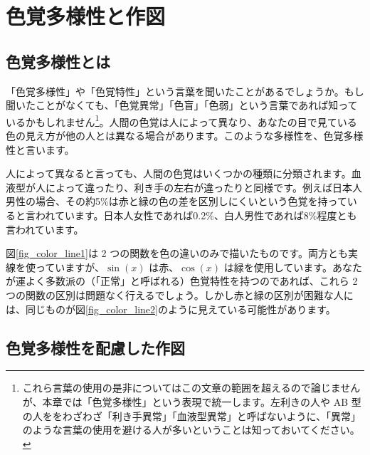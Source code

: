 \chapter{色覚多様性と作図}
\label{chap:color}

\section{色覚多様性とは}

「色覚多様性」や「色覚特性」という言葉を聞いたことがあるでしょうか。もし聞いたことがなくても、「色覚異常」「色盲」「色弱」という言葉であれば知っているかもしれません\footnote{これら言葉の使用の是非についてはこの文章の範囲を超えるので論じませんが、本章では「色覚多様性」という表現で統一します。左利きの人や AB 型の人ををわざわざ「利き手異常」「血液型異常」と呼ばないように、「異常」のような言葉の使用を避ける人が多いということは知っておいてください。}。人間の色覚は人によって異なり、あなたの目で見ている色の見え方が他の人とは異なる場合があります。このような多様性を、色覚多様性と言います。

人によって異なると言っても、人間の色覚はいくつかの種類に分類されます。血液型が人によって違ったり、利き手の左右が違ったりと同様です。例えば日本人男性の場合、その約5\%は赤と緑の色の差を区別しにくいという色覚を持っていると言われています。日本人女性であれば0.2\%、白人男性であれば8\%程度とも言われています。

図\ref{fig_color_line1}は 2 つの関数を色の違いのみで描いたものです。両方とも実線を使っていますが、$\sin(x)$ は赤、$\cos(x)$ は緑を使用しています。あなたが運よく多数派の（「正常」と呼ばれる）色覚特性を持つのであれば、これら 2 つの関数の区別は問題なく行えるでしょう。しかし赤と緑の区別が困難な人には、同じものが図\ref{fig_color_line2}のように見えている可能性があります。


\section{色覚多様性を配慮した作図}

